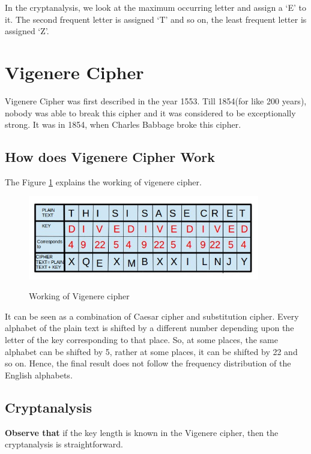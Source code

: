 \documentclass{llncs}
\begin{document}
In the cryptanalysis, we look at the maximum occurring letter and assign a `E' to it. The second frequent letter is assigned `T' and so on, the least frequent letter is assigned `Z'.

\section{Vigenere Cipher} 
Vigenere Cipher was first described in the year 1553. Till 1854(for like 200 years), nobody was able to break this cipher and it was considered to be exceptionally strong. It was in 1854, when Charles Babbage broke this cipher. 

\subsection{How does Vigenere Cipher Work}

The Figure \ref{vigenere} explains the working of vigenere cipher.

\begin{figure}[h]
\centering
\includegraphics[width=0.9\textwidth]{vigenere.jpg}
\label{vigenere}
\caption{Working of Vigenere cipher}
\end{figure}

It can be seen as a combination of Caesar cipher and substitution cipher. Every alphabet of the plain text is shifted by a different number depending upon the letter of the key corresponding to that place. So, at some places, the same alphabet can be shifted by 5, rather at some places, it can be shifted by 22 and so on. Hence, the final result does not follow the frequency distribution of the English alphabets. 

\subsection{Cryptanalysis}

\textbf{Observe that} if the key length is known in the Vigenere cipher, then the cryptanalysis is straightforward. \\
\end{document}
